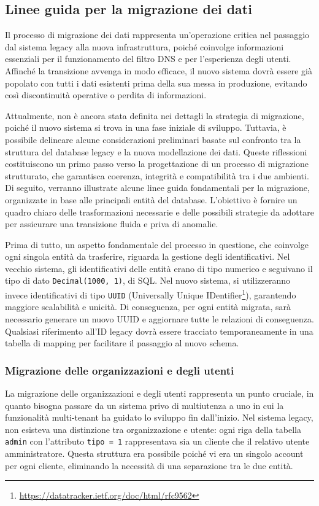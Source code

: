 \subsection{Linee guida per la migrazione dei dati}
Il processo di migrazione dei dati rappresenta un'operazione critica nel passaggio dal sistema legacy alla nuova infrastruttura, poiché coinvolge informazioni essenziali per il funzionamento del filtro DNS e per l'esperienza degli utenti. Affinché la transizione avvenga in modo efficace, il nuovo sistema dovrà essere già popolato con tutti i dati esistenti prima della sua messa in produzione, evitando così discontinuità operative o perdita di informazioni.

Attualmente, non è ancora stata definita nei dettagli la strategia di migrazione, poiché il nuovo sistema si trova in una fase iniziale di sviluppo. Tuttavia, è possibile delineare alcune considerazioni preliminari basate sul confronto tra la struttura del database legacy e la nuova modellazione dei dati. Queste riflessioni costituiscono un primo passo verso la progettazione di un processo di migrazione strutturato, che garantisca coerenza, integrità e compatibilità tra i due ambienti. Di seguito, verranno illustrate alcune linee guida fondamentali per la migrazione, organizzate in base alle principali entità del database. L'obiettivo è fornire un quadro chiaro delle trasformazioni necessarie e delle possibili strategie da adottare per assicurare una transizione fluida e priva di anomalie.

Prima di tutto, un aspetto fondamentale del processo in questione, che coinvolge ogni singola entità da trasferire, riguarda la gestione degli identificativi. Nel vecchio sistema, gli identificativi delle entità erano di tipo numerico e seguivano il tipo di dato \texttt{Decimal(1000, 1)}, di SQL. Nel nuovo sistema, si utilizzeranno invece identificativi di tipo \texttt{UUID} (Universally Unique IDentifier\footnote{\url{https://datatracker.ietf.org/doc/html/rfc9562}}), garantendo maggiore scalabilità e unicità. Di conseguenza, per ogni entità migrata, sarà necessario generare un nuovo UUID e aggiornare tutte le relazioni di conseguenza. Qualsiasi riferimento all'ID legacy dovrà essere tracciato temporaneamente in una tabella di mapping per facilitare il passaggio al nuovo schema.

\subsubsection{Migrazione delle organizzazioni e degli utenti}
La migrazione delle organizzazioni e degli utenti rappresenta un punto cruciale, in quanto bisogna passare da un sistema privo di multiutenza a uno in cui la funzionalità multi-tenant ha guidato lo sviluppo fin dall’inizio. Nel sistema legacy, non esisteva una distinzione tra organizzazione e utente: ogni riga della tabella \texttt{admin} con l'attributo \texttt{tipo = 1} rappresentava sia un cliente che il relativo utente amministratore. Questa struttura era possibile poiché vi era un singolo account per ogni cliente, eliminando la necessità di una separazione tra le due entità.

